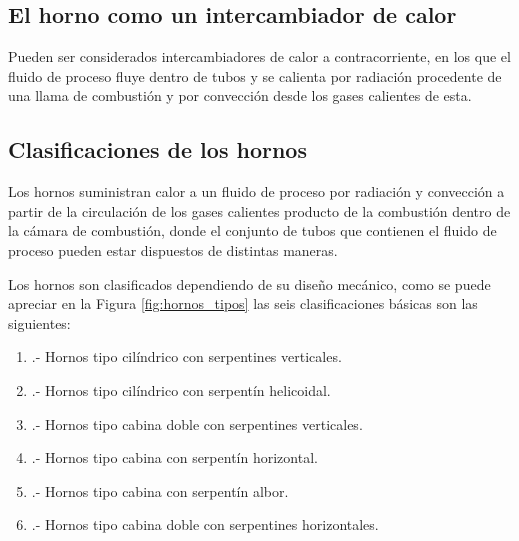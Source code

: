 \subsection{El horno como un intercambiador de calor}
\par Pueden ser considerados intercambiadores de calor a contracorriente, en los que el fluido de proceso fluye dentro de tubos y se calienta por radiación procedente de una llama de combustión y por convección desde los gases calientes de esta.

\subsection{Clasificaciones de los hornos}
\par Los hornos suministran calor a un fluido de proceso por radiación y convección a partir de la circulación de los gases calientes producto de la combustión dentro de la cámara de combustión, donde el conjunto de tubos que contienen el fluido de proceso pueden estar dispuestos de distintas maneras.\cite{bib:sandoval}
\par Los hornos son clasificados dependiendo de su diseño mecánico, como se puede apreciar en la Figura \ref{fig:hornos_tipos} las seis clasificaciones b\'asicas son las siguientes:\cite{pdvsa1}
\begin{enumerate}[label=\Alph*]
    \item .-  Hornos tipo cilíndrico con serpentines verticales.
    \item .-  Hornos tipo cilíndrico con serpentín helicoidal.
    \item .-  Hornos tipo cabina doble con serpentines verticales.
    \item .-  Hornos tipo cabina con serpentín horizontal.
    \item .-  Hornos tipo cabina con serpentín albor.
    \item .-  Hornos tipo cabina doble con serpentines horizontales.
\end{enumerate}
